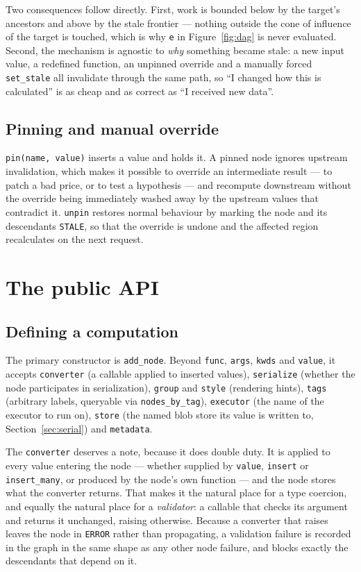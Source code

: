 \documentclass[11pt,a4paper]{article}
\newcommand{\code}[1]{\texttt{#1}}
\begin{document}
Two consequences follow directly. First, work is bounded below by the target's
ancestors and above by the stale frontier --- nothing outside the cone of
influence of the target is touched, which is why \code{e} in
Figure~\ref{fig:dag} is never evaluated. Second, the mechanism is agnostic to
\emph{why} something became stale: a new input value, a redefined function, an
unpinned override and a manually forced \code{set\_stale} all invalidate through
the same path, so ``I changed how this is calculated'' is as cheap and as
correct as ``I received new data''.

\subsection{Pinning and manual override}

\code{pin(name, value)} inserts a value and holds it. A pinned node ignores
upstream invalidation, which makes it possible to override an intermediate
result --- to patch a bad price, or to test a hypothesis --- and recompute
downstream without the override being immediately washed away by the upstream
values that contradict it. \code{unpin} restores normal behaviour by marking
the node and its descendants \code{STALE}, so that the override is undone and
the affected region recalculates on the next request.

\section{The public API}\label{sec:api}

\subsection{Defining a computation}

The primary constructor is \code{add\_node}. Beyond \code{func}, \code{args},
\code{kwds} and \code{value}, it accepts \code{converter} (a callable applied to
inserted values), \code{serialize} (whether the node participates in
serialization), \code{group} and \code{style} (rendering hints), \code{tags}
(arbitrary labels, queryable via \code{nodes\_by\_tag}), \code{executor} (the
name of the executor to run on), \code{store} (the named blob store its value
is written to, Section~\ref{sec:serial}) and \code{metadata}.

The \code{converter} deserves a note, because it does double duty. It is
applied to every value entering the node --- whether supplied by \code{value},
\code{insert} or \code{insert\_many}, or produced by the node's own function
--- and the node stores what the converter returns. That makes it the natural
place for a type coercion, and equally the natural place for a
\emph{validator}: a callable that checks its argument and returns it unchanged,
raising otherwise. Because a converter that raises leaves the node in
\code{ERROR} rather than propagating, a validation failure is recorded in the
graph in the same shape as any other node failure, and blocks exactly the
descendants that depend on it.
\end{document}
